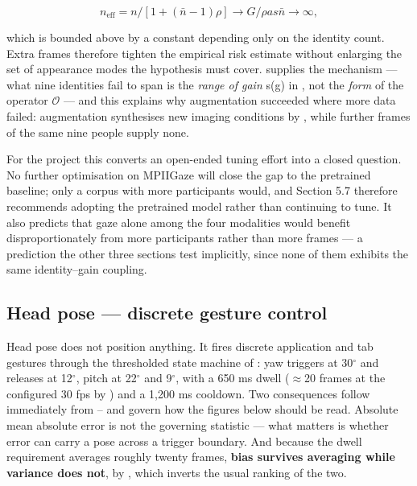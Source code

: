 \begin{equation}
\label{eq:222}
n_{\mathrm{eff}} = n / [ 1 + (\bar{n} - 1) \rho ] \to G / \rho as \bar{n} \to \infty ,
\end{equation}

which is bounded above by a constant depending only on the identity count. Extra frames therefore tighten the empirical risk estimate without enlarging the set of appearance modes the hypothesis must cover.  supplies the mechanism --- what nine identities fail to span is the \emph{range of gain} s(g) in , not the \emph{form} of the operator $\mathcal{O}$ --- and this explains why augmentation succeeded where more data failed: augmentation synthesises new imaging conditions by , while further frames of the same nine people supply none.

For the project this converts an open-ended tuning effort into a closed question. No further optimisation on MPIIGaze will close the gap to the pretrained baseline; only a corpus with more participants would, and Section 5.7 therefore recommends adopting the pretrained model rather than continuing to tune. It also predicts that gaze alone among the four modalities would benefit disproportionately from more participants rather than more frames --- a prediction the other three sections test implicitly, since none of them exhibits the same identity--gain coupling.

\FloatBarrier

\subsection{Head pose --- discrete gesture control}

Head pose does not position anything. It fires discrete application and tab gestures through the thresholded state machine of : yaw triggers at 30$^{\circ}$ and releases at 12$^{\circ}$, pitch at 22$^{\circ}$ and 9$^{\circ}$, with a 650 ms dwell ($\approx$20 frames at the configured 30 fps by ) and a 1,200 ms cooldown. Two consequences follow immediately from -- and govern how the figures below should be read. Absolute mean absolute error is not the governing statistic --- what matters is whether error can carry a pose across a trigger boundary. And because the dwell requirement averages roughly twenty frames, \textbf{bias survives averaging while variance does not}, by , which inverts the usual ranking of the two.

